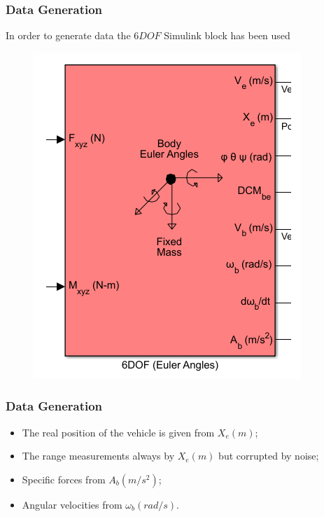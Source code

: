 \documentclass{beamer}
\begin{document}
	\begin{frame}
		\frametitle{Data Generation}
		In order to generate data the $6DOF$ Simulink block has been used
		\begin{figure}[H]
			\includegraphics[scale=0.4]{6DOF}
		\end{figure}
	\end{frame}
	
	\begin{frame}
		\frametitle{Data Generation}
		\begin{itemize}
			\item The real position of the vehicle is given from $X_e(m)$;
			\item The range measurements always by $X_e(m)$ but corrupted by noise;
			\item Specific forces from $A_b(m/s^2)$;
			\item Angular velocities from $\omega_b(rad/s)$.
		\end{itemize}
	\end{frame}


	
\end{document}
